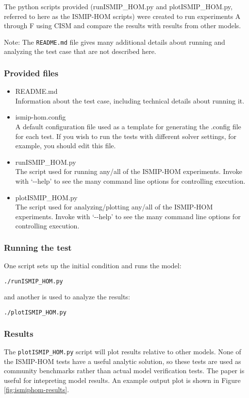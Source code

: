 The python scripts provided (runISMIP\_HOM.py and plotISMIP\_HOM.py, referred to here as the ISMIP-HOM 
scripts) were created to run experiments A through F using CISM and compare the results with results from other models. 

Note: The \texttt{README.md} file gives many additional details about running and analyzing the
test case that are not described here.

\subsubsection{Provided files}

\begin{itemize}
	\item README.md \\
		Information about the test case, including technical details about running it.
	\item ismip-hom.config \\
		A default configuration file used as a template for generating the .config file for each test.
    		If you wish to run the tests with different solver settings, for example, you should edit this file.
	\item runISMIP\_HOM.py \\
		The script used for running any/all of the ISMIP-HOM experiments.  
    		Invoke with `-{}-help' to see the many command line options for controlling execution.
  \item plotISMIP\_HOM.py \\
		The script used for analyzing/plotting any/all of the ISMIP-HOM experiments.  
    		Invoke with `-{}-help' to see the many command line options for controlling execution.
\end{itemize}

\subsubsection{Running the test}
One script sets up the initial condition and runs the model:

\texttt{./runISMIP\_HOM.py}

\noindent
and another is used to analyze the results:

\texttt{./plotISMIP\_HOM.py}

\subsubsection{Results}
The \texttt{plotISMIP\_HOM.py} script will plot results relative to other models.
None of the ISMIP-HOM tests have a useful analytic solution, so these tests are
used as community benchmarks rather than actual model verification tests.
The \citet{Pattyn2008} paper is useful for intepreting model results.
An example output plot is shown in Figure \ref{fig:ismiphom-results}.

